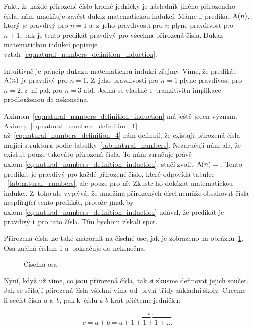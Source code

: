 Fakt, že každé přirozené číslo kromě jedničky je následník jiného přirozeného čísla, nám umožňuje zavést důkaz matematickou indukcí. Máme-li predikát \(\mathrm{A}(n)\), který je pravdivý pro \(n=1\) a~z~jeho pravdivosti pro \(n\) plyne  pravdivost pro \(n + 1\), pak je tento predikát pravdivý pro všechna přirozená čísla. Důkaz matematickou
indukcí popisuje vztah~\eqref{eq:natural_numbers_definition_induction}.

Intuitivně je princip důkazu matematickou indukcí zřejmý. Víme, že predikát \(\mathrm{A}(n)\) je pravdivý pro \(n=1\). Z~jeho pravdivosti pro \(n=1\) plyne pravdivost pro \(n=2\), z~ní pak pro \(n=3\) atd. Jedná se vlastně o~tranzitivitu implikace prodlouženou do nekonečna.

Aximom~\eqref{eq:natural_numbers_definition_induction} má ještě jeden význam. Axiomy~\eqref{eq:natural_numbers_definition_1} až~\eqref{eq:natural_numbers_definition_4} nám definují, že existují přirozená čísla mající strukturu podle tabulky~\ref{tab:natural_numbers}. Nezaručují nám ale, že existují pouze takováto přirozená čísla. To nám zaručuje právě axiom~\eqref{eq:natural_numbers_definition_induction}, stačí zvolit \(\mathrm{A}(n) = \) . Tento predikát je pravdivý pro každé přirozené číslo, které odpovídá tabulce ~\ref{tab:natural_numbers}, ale pouze pro ně. Zkuste ho dokázat matematickou indukcí. Z~toho ale vyplývá, že množina přirozených čísel nemůže obsahovat čísla nesplňující tento predikát, protože jinak by axiom~\eqref{eq:natural_numbers_definition_induction} udával, že predikát je pravdivý i~pro tato čísla. Tím bychom získali spor.

Přirozená čísla lze také znázornit na číselné ose, jak je zobrazeno na obrázku~\ref{img:ciselna_osa}. Osa začíná číslem 1 a~pokračuje do nekonečna.

\begin{figure}[!h]
\centering
{}
\caption{Číselná osa}
\label{img:ciselna_osa}
\end{figure}

Nyní, když už víme, co jsou přirozená čísla, tak si zkusme definovat jejich součet. Jak se sčítají přirozená čísla všichni víme od~první třídy základní školy. Chceme-li sečíst čísla \(a\) a~\(b\), pak k~číslu \(a\) \(b\)-krát přičteme jedničku:

\begin{equation}
\label{eq:soucet_n_definice}
c = a + b = a + \overbrace{1 + 1 + 1 + ...}^{b \times}
\end{equation}

